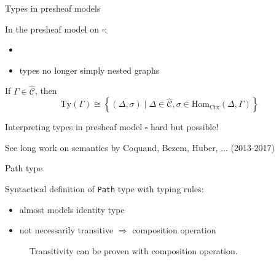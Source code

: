 \documentclass[english,draft]{beamer}
\newcommand{\op}[1]{\mathtt{#1}}
\newcommand{\pa}[3]{\op{Path}_{#1}\left(#2, #3\right)}
\begin{document}
\begin{frame}{Types in presheaf models}

In the presheaf model on $\square$:
\begin{itemize}
    \item 
    \item types no longer simply nested graphs
\end{itemize}


\begin{lemma}

If $\Gamma \in \widehat{\mathcal{C}}$, then 
$$\text{Ty}(\Gamma) \cong \left\{ (\Delta, \sigma) \mid \Delta \in \widehat{\mathcal{C}}, \sigma \in \text{Hom}_{\text{Ctx}}(\Delta , \Gamma) \right\}$$
\end{lemma}

\pause


Interpreting types in presheaf model $\square$ hard but possible! 

See long work on semantics by Coquand, Bezem, Huber, ... (2013-2017) 


\end{frame}

\begin{frame}{Path type}
 
 Syntactical definition of \texttt{Path} type with typing rules:

\begin{prooftree}

\end{prooftree}

% 

\begin{itemize}
 \item almost models identity type
 \item not necessarily transitive $\Rightarrow$ composition operation
\end{itemize}


\begin{figure}
\centering

\caption{Transitivity can be proven with composition operation.}
\end{figure}

\end{frame}
\end{document}
